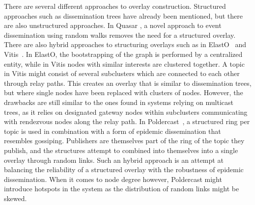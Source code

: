There are several different approaches to overlay construction.
Structured approaches such as dissemination trees have already been
mentioned, but there are also unstructured approaches. In Quasar
\cite{Wong:2008}, a novel approach to event dissemination using random
walks removes the need for a structured overlay.  There are also hybrid
approaches to structuring overlays such as in ElastO~\cite{Chen:2013}
and Vitis~\cite{Rahimian:2011}. In ElastO, the bootstrapping of the
graph is performed by a centralized entity, while in Vitis nodes with
similar interests are clustered together. A topic in Vitis might consist
of several subclusters which are connected to each other through relay
paths. This creates an overlay that is similar to dissemination trees,
but where single nodes have been replaced with clusters of nodes.
However, the drawbacks are still similar to the ones found in systems
relying on multicast trees, as it relies on designated gateway nodes
within subclusters communicating with rendezvous nodes along the relay
path. In Poldercast~\cite{Setty:2012}, a structured ring per topic is
used in combination with a form of epidemic dissemination that resembles
gossiping. Publishers are themselves part of the ring of the topic they
publish, and the structures attempt to combined into themselves into a
single overlay through random links. Such an hybrid approach is an
attempt at balancing the reliability of a structured overlay with the
robustness of epidemic dissemination. When it comes to node degree
however, Poldercast might introduce hotspots in the system as the
distribution of random links might be skewed.

